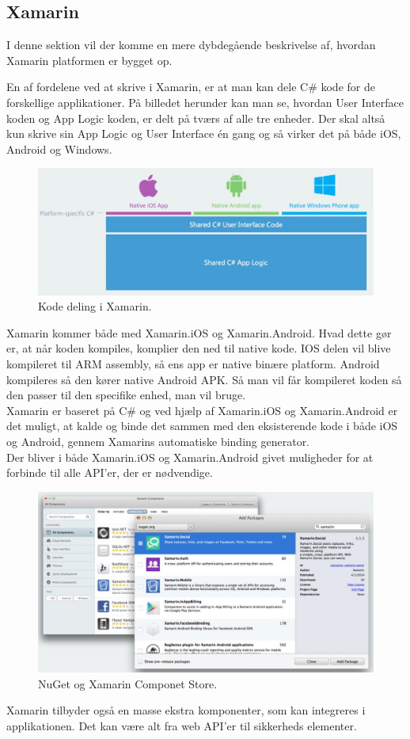 \subsection{Xamarin}
I denne sektion vil der komme en mere dybdegående beskrivelse af, hvordan Xamarin platformen er bygget op.

En af fordelene ved at skrive i Xamarin, er at man kan dele C\# kode for de forskellige applikationer.
På billedet herunder kan man se, hvordan User Interface koden og App Logic koden, er delt på tværs af alle tre enheder. Der skal altså kun skrive sin App Logic og User Interface én gang og så virker det på både iOS, Android og Windows.
\begin{figure}[H]
	\centering
	\includegraphics[width=1\linewidth]{Applikation/XarmarinShare.JPG}
	\caption{Kode deling i Xamarin.\cite{Xarmain}}
	\label{fig:CodeShare}
\end{figure}

\clearpage

Xamarin kommer både med Xamarin.iOS og Xamarin.Android. Hvad dette gør er, at når koden kompiles, komplier den ned til native kode. IOS delen vil blive kompileret til ARM assembly, så ens app er native binære platform. Android kompileres så den kører native Android APK. Så man vil får kompileret koden så den passer til den specifike enhed, man vil bruge. \\
Xamarin er baseret på C\# og ved hjælp af Xamarin.iOS og Xamarin.Android er det muligt, at kalde og binde det sammen med den eksisterende kode i både iOS og Android, gennem Xamarins automatiske binding generator. \\
Der bliver i både Xamarin.iOS og Xamarin.Android givet muligheder for at forbinde til alle API'er, der er nødvendige. \\

\begin{figure}[H]
	\centering
	\includegraphics[width=0.7\linewidth]{Applikation/NuGet.JPG}
	\caption{NuGet og Xamarin Componet Store.\cite{Xarmain}}
	\label{fig:NuGet}
\end{figure}
Xamarin tilbyder også en masse ekstra komponenter, som kan integreres i applikationen. Det kan være alt fra web API'er til sikkerheds elementer.

\clearpage